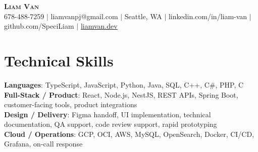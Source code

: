 \documentclass[letterpaper,11pt]{article}
\begin{document}

%
\begin{center}
    \textbf{\Huge \scshape Liam Van} \\ \vspace{1pt}
    \small 678-488-7259 $|$ \small {liamvanpj@gmail.com} $|$ Seattle, WA
 {{$|$ linkedin.com/in/liam-van} {$|$ github.com/SpeciLiam} {$|$ \href{https://liamvan.dev}{liamvan.dev}}}

\end{center}

\section{Technical Skills}
 \begin{itemize}[leftmargin=0.15in, label={}]
    \small{\item{
     \textbf{Languages}{: TypeScript, JavaScript, Python, Java, SQL, C++, C\#, PHP, C} \\
     \textbf{Full-Stack / Product}{: React, Node.js, NestJS, REST APIs, Spring Boot, customer-facing tools, product integrations} \\
     \textbf{Design / Delivery}{: Figma handoff, UI implementation, technical documentation, QA support, code review support, rapid prototyping} \\
     \textbf{Cloud / Operations}{: GCP, OCI, AWS, MySQL, OpenSearch, Docker, CI/CD, Grafana, on-call response} \\
    }}
 \end{itemize}
%
\end{document}
